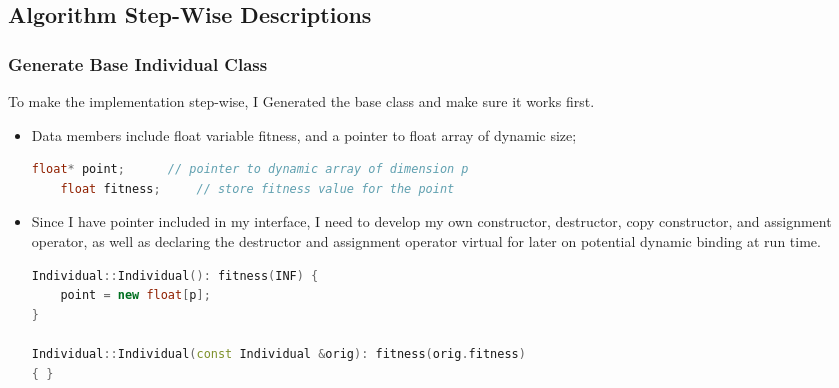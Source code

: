 \documentclass{article}
\begin{document}
\begin{CJK}{UTF8}{gbsn}
\subsection{Algorithm Step-Wise Descriptions}


\subsubsection{Generate Base Individual Class}
To make the implementation step-wise, I Generated the base class and make sure it works first.
\begin{itemize}
  \itemsep=-3pt

\item Data members include float variable fitness, and a pointer to float array of dynamic size;
\begin{lstlisting}[language=c++]
    float* point;      // pointer to dynamic array of dimension p
    float fitness;     // store fitness value for the point
\end{lstlisting}
  
\item Since I have pointer included in my interface, I need to develop my own constructor, destructor, copy constructor, and assignment operator, as well as declaring the destructor and assignment operator virtual for later on potential dynamic binding at run time. 
\begin{lstlisting}[language=c++]
Individual::Individual(): fitness(INF) {
    point = new float[p];
}

Individual::Individual(const Individual &orig): fitness(orig.fitness)
{ }
\end{lstlisting}
\end{itemize}

\end{CJK}
\end{document}
